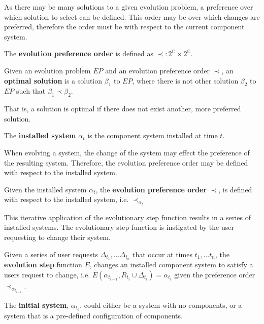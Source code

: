 As there may be many solutions to a given evolution problem, a preference over which solution to select can be defined.
This order may be over which changes are preferred, therefore the order must be with respect to the current component system. 
\begin{defs}
The \textbf{evolution preference order} is defined as $\prec: 2^{\mathbb{C}} \times 2^{\mathbb{C}}$.
\end{defs}

\begin{defs}
Given an evolution problem $EP$ and an evolution preference order $\prec$, 
an \textbf{optimal solution} is a solution $\beta_1$ to $EP$, where there is not other solution $\beta_2$ to $EP$ such that $\beta_1 \prec \beta_2$.
\end{defs}
That is, a solution is optimal if there does not exist another, more preferred solution.

\begin{defs}
The \textbf{installed system} $\alpha_t$ is the component system installed at time $t$.
\end{defs}

When evolving a system, the change of the system may effect the preference of the resulting system.
Therefore, the evolution preference order may be defined with respect to the installed system.
\begin{defs}
Given the installed system $\alpha_t$, the \textbf{evolution preference order} $\prec$, is defined with respect to the installed system, i.e. $\prec_{\alpha_t}$
\end{defs}

This iterative application of the evolutionary step function results in a series of installed systems.
The evolutionary step function is instigated by the user requesting to change their system.
\begin{defs}
Given a series of user requests $\Delta_{t_1},\ldots \Delta_{t_n}$ that occur at times $t_1,\ldots t_n$, 
the \textbf{evolution step} function $E$, changes an installed component system to satisfy a users request to change,
i.e. $E(\alpha_{t_{i-1}}, R_{t_i} \cup \Delta_{t_i}) = \alpha_{t_i}$ given the preference order $\prec_{\alpha_{t_{i-1}}}$.
\end{defs}

\begin{defs}
The \textbf{initial system}, $\alpha_{t_0}$, could either be a system with no components, or a system that is a pre-defined configuration of components.
\end{defs}

